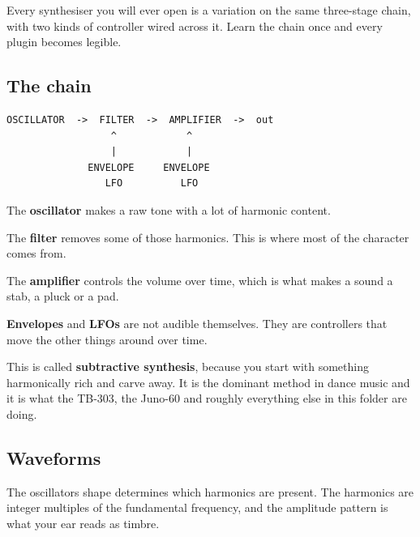 Every synthesiser you will ever open is a variation on the same three-stage chain, with two
kinds of controller wired across it. Learn the chain once and every plugin becomes legible.

\subsection{The chain}\label{th05_sound_design-the-chain}

\begin{verbatim}
OSCILLATOR  ->  FILTER  ->  AMPLIFIER  ->  out
                  ^            ^
                  |            |
              ENVELOPE     ENVELOPE
                 LFO          LFO
\end{verbatim}

The \textbf{oscillator} makes a raw tone with a lot of harmonic content.

The \textbf{filter} removes some of those harmonics. This is where most of the character comes
from.

The \textbf{amplifier} controls the volume over time, which is what makes a sound a stab, a pluck
or a pad.

\textbf{Envelopes} and \textbf{LFOs} are not audible themselves. They are controllers that move the
other things around over time.

This is called \textbf{subtractive synthesis}, because you start with something harmonically rich
and carve away. It is the dominant method in dance music and it is what the TB-303, the
Juno-60 and roughly everything else in this folder are doing.

\subsection{Waveforms}\label{th05_sound_design-waveforms}

The oscillator\textquotesingle s shape determines which harmonics are present. The harmonics are integer
multiples of the fundamental frequency, and the amplitude pattern is what your ear reads as
timbre.

